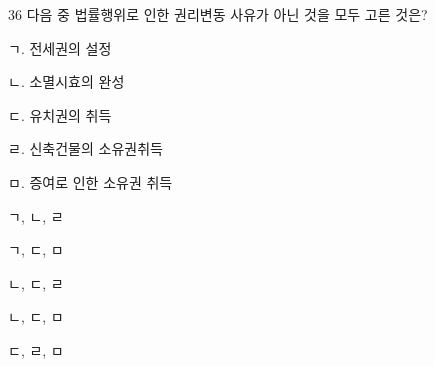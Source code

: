 \begin{question}{36}
다음 중 법률행위로 인한 권리변동 사유가 아닌 것을 모두 고른 것은?
\begin{framedtext}
ㄱ. 전세권의 설정 \par
ㄴ. 소멸시효의 완성 \par
ㄷ. 유치권의 취득 \par
ㄹ. 신축건물의 소유권취득 \par
ㅁ. 증여로 인한 소유권 취득 \par
\end{framedtext}
\begin{choices}
  \item ㄱ, ㄴ, ㄹ
  \item ㄱ, ㄷ, ㅁ
  \item ㄴ, ㄷ, ㄹ
  \item ㄴ, ㄷ, ㅁ
  \item ㄷ, ㄹ, ㅁ
\end{choices}
\end{question}
